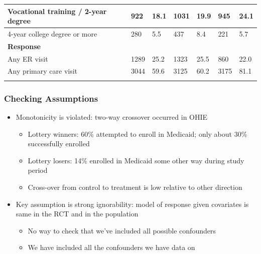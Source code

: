 \documentclass{beamer}
\begin{document}
\begin{frame}
{\begin{longtable}{lllllll}
   \hline
Vocational training / 2-year degree & 922 & 18.1 & 1031 & 19.9 & 945 & 24.1 \\ 
   \hline
4-year college degree or more & 280 & 5.5 & 437 & 8.4 & 221 & 5.7 \\ 
   \hline
\hline
 \textbf{Response} &   &  &  & &  &  \\ 
Any ER visit & 1289 & 25.2 & 1323 & 25.5 & 860 & 22.0  \\ 
   \hline
\hline
Any primary care visit & 3044 & 59.6 & 3125 & 60.2 & 3175 & 81.1 \\ 
\hline
\hline
\label{rct-nrt-compare}
\end{longtable}
}
\end{frame}

\begin{frame}
\frametitle{Checking Assumptions} 
\begin{itemize}
\item Monotonicity is violated: two-way crossover occurred in OHIE
\begin{itemize}
\item Lottery winners: 60\% attempted to enroll in Medicaid; only about 30\% successfully enrolled
\item Lottery losers: 14\% enrolled in Medicaid some other way during study period
\item Cross-over from control to treatment is low relative to other direction
\end{itemize}
\item Key assumption is strong ignorability: model of response given covariates is same in the RCT and in the population
\begin{itemize}
\item No way to check that we've included all possible confounders
\item We have included all the confounders we have data on
\end{itemize}
\end{itemize}
\end{frame}
\end{document}

